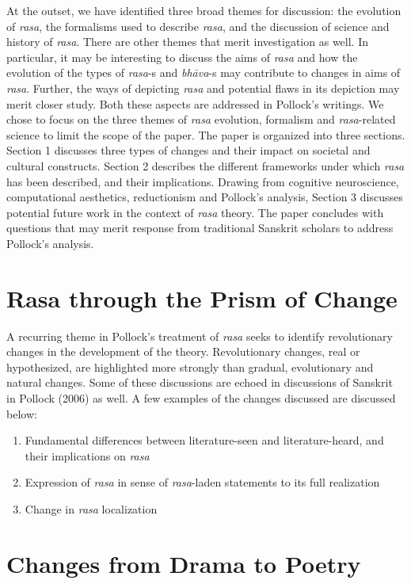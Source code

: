 At the outset, we have identified three broad themes for discussion: the evolution of \textsl{rasa}, the formalisms used to describe \textsl{rasa}, and the discussion of science and history of \textsl{rasa}. There are other themes that merit investigation as well. In particular, it may be interesting to discuss the aims of \textsl{rasa} and how the evolution of the types of \hbox{\textsl{rasa}-s} and \textsl{bhāva}-s may contribute to changes in aims of \textsl{rasa}. Further, the ways of depicting \textsl{rasa }and potential flaws in its depiction may merit closer study. Both these aspects are addressed in Pollock’s writings. We chose to focus on the three themes of \textsl{rasa }evolution, formalism and \textsl{rasa}-related science to limit the scope of the paper. The paper is organized into three sections. Section 1 discusses three types of changes and their impact on societal and cultural constructs. Section 2 describes the different frameworks under which \textsl{rasa }has been described, and their implications. Drawing from cognitive neuroscience, computational aesthetics, reductionism and Pollock’s analysis, Section 3 discusses potential future work in the context of \textsl{rasa }theory. The paper concludes with questions that may merit response from traditional Sanskrit scholars to address Pollock’s analysis.

\section*{Rasa through the Prism of Change}

A recurring theme in Pollock’s treatment of \textsl{rasa} seeks to identify revolutionary changes in the development of the theory. Revolutionary changes, real or hypothesized, are highlighted more strongly than gradual, evolutionary and natural changes. Some of these discussions are echoed in discussions of Sanskrit in Pollock (2006) as well. A few examples of the changes discussed are discussed below:
\begin{enumerate}
\itemsep=0pt
\item Fundamental differences between literature-seen and literature-heard, and their implications on \textsl{rasa }
\item Expression of \textsl{rasa} in sense of \textsl{rasa}-laden statements to its full realization
\item Change in \textsl{rasa} localization
\end{enumerate}

\section*{Changes from Drama to Poetry}

